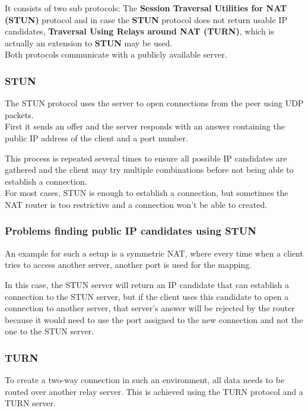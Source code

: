 \documentclass[../../../thesis.tex]{subfiles}
\begin{document}
It consists of two sub protocols: The \textbf{Session Traversal Utilities for NAT (STUN)} protocol and in case the \textbf{STUN} protocol does not return usable IP candidates, \textbf{Traversal Using Relays around NAT (TURN)}, which is actually an extension to \textbf{STUN} may be used.\\
Both protocols communicate with a publicly available server.\par

\subsubsection{STUN}
The STUN protocol uses the server to open connections from the peer using UDP packets.\\First it sends an offer and the server responds with an answer containing the public IP address of the client and a port number.\par
This process is repeated several times to ensure all possible IP candidates are gathered and the client may try multiple combinations before not being able to establish a connection.\\

\noindent
For most cases\footnotemark, STUN is enough to establish a connection, but sometimes the NAT router is too restrictive and a connection won't be able to created.


\subsubsection{Problems finding public IP candidates using STUN}
An example for such a setup is a symmetric NAT\cite[section 5]{rfc3489}, where every time when a client tries to access another server, another port is used for the mapping.

In this case, the STUN server will return an IP candidate that can establish a connection to the STUN server, but if the client uses this candidate to open a connection to another server, that server's answer will be rejected by the router because it would need to use the port assigned to the new connection and not the one to the STUN server.


\subsubsection{TURN}
\label{sec:turn}
To create a two-way connection in such an environment, all data needs to be routed over another relay server. This is achieved using the TURN protocol and a TURN server.\\
\end{document}

